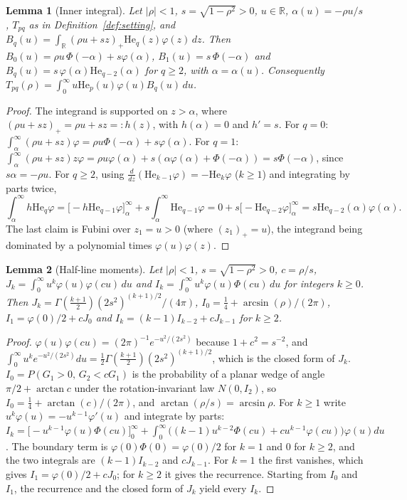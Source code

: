\documentclass[11pt]{article}
\newtheorem{lemma}{Lemma}
\theoremstyle{definition}
\newcommand{\R}{\mathbb{R}}
\newcommand{\He}{\mathrm{He}}
\begin{document}
\begin{lemma}[Inner integral]\label{lem:inner}
Let $|\rho|<1$, $s=\sqrt{1-\rho^2}>0$, $u\in\R$, $\alpha(u)=-\rho u/s$, $T_{pq}$ as in
Definition~\ref{def:setting}, and
$B_q(u)=\int_\R(\rho u+sz)_+\He_q(z)\varphi(z)\,dz$. Then
$B_0(u)=\rho u\,\Phi(-\alpha)+s\varphi(\alpha)$, $B_1(u)=s\,\Phi(-\alpha)$ and
$B_q(u)=s\,\varphi(\alpha)\He_{q-2}(\alpha)$ for $q\ge2$, with $\alpha=\alpha(u)$.
Consequently $T_{pq}(\rho)=\int_0^\infty u\He_p(u)\varphi(u)B_q(u)\,du$.
\end{lemma}

\begin{proof}
The integrand is supported on $z>\alpha$, where $(\rho u+sz)_+=\rho u+sz=:h(z)$, with
$h(\alpha)=0$ and $h'=s$. For $q=0$: $\int_\alpha^\infty(\rho u+sz)\varphi=\rho u\Phi(-\alpha)+s\varphi(\alpha)$.
For $q=1$: $\int_\alpha^\infty(\rho u+sz)z\varphi=\rho u\varphi(\alpha)+s(\alpha\varphi(\alpha)+\Phi(-\alpha))
=s\Phi(-\alpha)$, since $s\alpha=-\rho u$. For $q\ge2$, using
$\frac{d}{dz}(\He_{k-1}\varphi)=-\He_k\varphi$ ($k\ge1$) and integrating by parts twice,
\[
\int_\alpha^\infty h\He_q\varphi=\big[-h\He_{q-1}\varphi\big]_\alpha^\infty+s\int_\alpha^\infty\He_{q-1}\varphi
=0+s\big[-\He_{q-2}\varphi\big]_\alpha^\infty=s\He_{q-2}(\alpha)\varphi(\alpha).
\]
The last claim is Fubini over $z_1=u>0$ (where $(z_1)_+=u$), the integrand being
dominated by a polynomial times $\varphi(u)\varphi(z)$.
\end{proof}

\begin{lemma}[Half-line moments]\label{lem:moments}
Let $|\rho|<1$, $s=\sqrt{1-\rho^2}>0$, $c=\rho/s$, $J_k=\int_0^\infty u^k\varphi(u)\varphi(cu)\,du$ and
$I_k=\int_0^\infty u^k\varphi(u)\Phi(cu)\,du$ for integers $k\ge0$. Then
$J_k=\Gamma(\tfrac{k+1}{2})(2s^2)^{(k+1)/2}/(4\pi)$,
$I_0=\tfrac14+\arcsin(\rho)/(2\pi)$, $I_1=\varphi(0)/2+cJ_0$ and
$I_k=(k-1)I_{k-2}+cJ_{k-1}$ for $k\ge2$.
\end{lemma}

\begin{proof}
$\varphi(u)\varphi(cu)=(2\pi)^{-1}e^{-u^2/(2s^2)}$ because $1+c^2=s^{-2}$, and
$\int_0^\infty u^ke^{-u^2/(2s^2)}du=\tfrac12\Gamma(\tfrac{k+1}2)(2s^2)^{(k+1)/2}$, which is
the closed form of $J_k$.
$I_0=P(G_1>0,\,G_2<cG_1)$ is the probability of a planar wedge of angle
$\pi/2+\arctan c$ under the rotation-invariant law $N(0,I_2)$, so
$I_0=\tfrac14+\arctan(c)/(2\pi)$, and $\arctan(\rho/s)=\arcsin\rho$.
For $k\ge1$ write $u^k\varphi(u)=-u^{k-1}\varphi'(u)$ and integrate by parts:
$I_k=\big[-u^{k-1}\varphi(u)\Phi(cu)\big]_0^\infty+\int_0^\infty\big((k-1)u^{k-2}\Phi(cu)+cu^{k-1}\varphi(cu)\big)\varphi(u)du$.
The boundary term is $\varphi(0)\Phi(0)=\varphi(0)/2$ for $k=1$ and $0$ for $k\ge2$, and
the two integrals are $(k-1)I_{k-2}$ and $cJ_{k-1}$. For $k=1$ the first vanishes, which
gives $I_1=\varphi(0)/2+cJ_0$; for $k\ge2$ it gives the recurrence. Starting from $I_0$
and $I_1$, the recurrence and the closed form of $J_k$ yield every $I_k$.
\end{proof}
\end{document}
